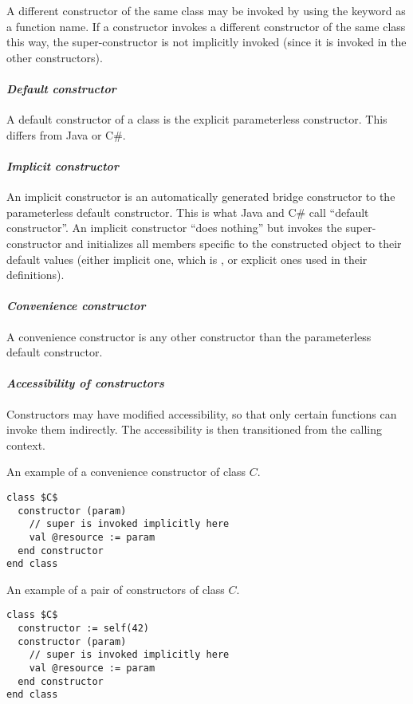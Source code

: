 A different constructor of the same class may be invoked by using the  keyword as a function name. If a constructor invokes a different constructor of the same class this way, the super-constructor is not implicitly invoked (since it is invoked in the other constructors). 

\paragraph{\em Default constructor}
A default constructor of a class is the explicit parameterless constructor. This differs from Java or C\#. 

\paragraph{\em Implicit constructor}
An implicit constructor is an automatically generated bridge constructor to the parameterless default constructor. This is what Java and C\# call ``default constructor''. An implicit constructor ``does nothing'' but invokes the super-constructor and initializes all members specific to the constructed object to their default values (either implicit one, which is , or explicit ones used in their definitions). 

\paragraph{\em Convenience constructor}
A convenience constructor is any other constructor than the parameterless default constructor. 

\paragraph{\em Accessibility of constructors}
Constructors may have modified accessibility, so that only certain functions can invoke them indirectly. The accessibility is then transitioned from the calling context. 

\example An example of a convenience constructor of class $C$.
\begin{lstlisting}
class $C$
  constructor (param)
    // super is invoked implicitly here
    val @resource := param
  end constructor
end class
\end{lstlisting}

\example An example of a pair of constructors of class $C$. 
\begin{lstlisting}
class $C$
  constructor := self(42)
  constructor (param)
    // super is invoked implicitly here
    val @resource := param
  end constructor
end class
\end{lstlisting}

